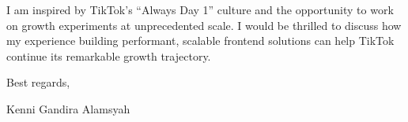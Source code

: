 \documentclass[12pt]{article}
\begin{document}
\vspace{0.5em}

I am inspired by TikTok's ``Always Day 1'' culture and the opportunity to work on growth experiments at unprecedented scale. I would be thrilled to discuss how my experience building performant, scalable frontend solutions can help TikTok continue its remarkable growth trajectory.

\vspace{1em}

Best regards,

\vspace{0.5em}

Kenni Gandira Alamsyah
\end{document}
